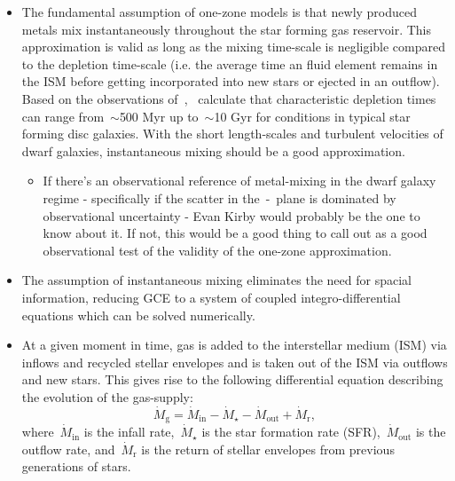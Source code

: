 \documentclass[ms.tex]{subfiles}
\begin{document}
\begin{itemize}

	\item The fundamental assumption of one-zone models is that newly produced
	metals mix instantaneously throughout the star forming gas reservoir.
	This approximation is valid as long as the mixing time-scale is negligible
	compared to the depletion time-scale (i.e. the average time an fluid
	element remains in the ISM before getting incorporated into new stars or
	ejected in an outflow).
	Based on the observations of~\citet{Leroy2008},~\citet*{Weinberg2017}
	calculate that characteristic depletion times can range from~$\sim$500 Myr
	up to~$\sim$10 Gyr for conditions in typical star forming disc galaxies.
	With the short length-scales and turbulent velocities of dwarf galaxies,
	instantaneous mixing should be a good approximation.

	\begin{itemize}
		\item {\color{red}
		If there's an observational reference of metal-mixing in the dwarf
		galaxy regime - specifically if the scatter in the~\afe-\feh~plane is
		dominated by observational uncertainty - Evan Kirby would probably be
		the one to know about it.
		If not, this would be a good thing to call out as a good observational
		test of the validity of the one-zone approximation.
		}
	\end{itemize}

	\item The assumption of instantaneous mixing eliminates the need for
	spacial information, reducing GCE to a system of coupled
	integro-differential equations which can be solved numerically.

	\item At a given moment in time, gas is added to the interstellar medium
	(ISM) via inflows and recycled stellar envelopes and is taken out of the
	ISM via outflows and new stars.
	This gives rise to the following differential equation describing the
	evolution of the gas-supply:
	\begin{equation}
	\dot{M}_\text{g} = \dot{M}_\text{in} - \dot{M}_\star - \dot{M}_\text{out}
	+ \dot{M}_\text{r},
	\end{equation}
	where~$\dot{M}_\text{in}$ is the infall rate,~$\dot{M}_\star$ is the star
	formation rate (SFR),~$\dot{M}_\text{out}$ is the outflow rate,
	and~$\dot{M}_\text{r}$ is the return of stellar envelopes from previous
	generations of stars.


\end{itemize}
\end{document}
